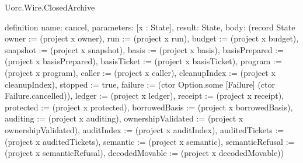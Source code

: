 \begin{lexlean}{Uorc.Wire.ClosedArchive}
\begin{semanticmodule}
definition{
  name: cancel,
  parameters: [x : State],
  result: State,
  body: (record State {owner := (project x owner), run := (project x run), budget := (project x budget), snapshot := (project x snapshot), basis := (project x basis), basisPrepared := (project x basisPrepared), basisTicket := (project x basisTicket), program := (project x program), caller := (project x caller), cleanupIndex := (project x cleanupIndex), stopped := true, failure := (ctor Option.some [Failure] (ctor Failure.cancelled)), ledger := (project x ledger), receipt := (project x receipt), protected := (project x protected), borrowedBasis := (project x borrowedBasis), auditing := (project x auditing), ownershipValidated := (project x ownershipValidated), auditIndex := (project x auditIndex), auditedTickets := (project x auditedTickets), semantic := (project x semantic), semanticRefusal := (project x semanticRefusal), decodedMovable := (project x decodedMovable)})
}


\end{semanticmodule}
\end{lexlean}
